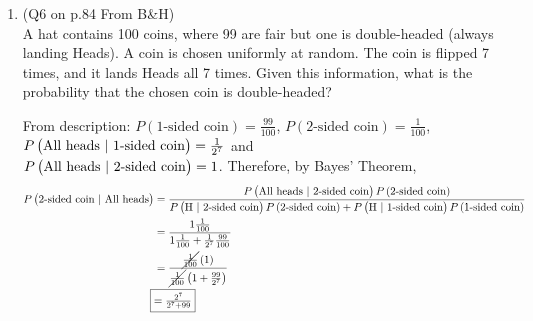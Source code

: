 \documentclass[11pt]{article}
\begin{document}
\begin{enumerate}
	\item (Q6 on p.84 From B\&H)\\
	A hat contains 100 coins, where 99 are fair but one is double-headed (always landing Heads). A coin is chosen uniformly at random. The coin is flipped 7 times, and it lands Heads all 7 times. Given this information, what is the probability that the chosen coin is double-headed?
		\begin{mdframed}
			From description: $ P\left( \text{1-sided coin} \right) = \frac{99}{100}$, $ P\left( \text{2-sided coin} \right) = \frac{1}{100} $, $ P\left( \text{All heads $ | $ 1-sided coin} \right) = \frac{1}{2^7}$ and \\
			$ P\left( \text{All heads $ | $ 2-sided coin} \right) = 1$. Therefore, by Bayes' Theorem,
			\begin{align*}
				P\left( \text{2-sided coin $ | $ All heads} \right) &= \frac{P\left( \text{All heads $ | $ 2-sided coin} \right) P\left( \text{2-sided coin} \right)}{P\left( \text{H $ | $ 2-sided coin} \right) P\left( \text{2-sided coin} \right) + P\left( \text{H $ | $ 1-sided coin} \right)P\left( \text{1-sided coin} \right)}\\
				&= \frac{1 \frac{1}{100}}{1 \frac{1}{100} + \frac{1}{2^7}\frac{99}{100}}\\
				&= \frac{\cancel{\frac{1}{100}}\left( 1 \right)}{\cancel{\frac{1}{100}}\left( 1 + \frac{99}{2^7} \right)}\\
				\Aboxed{&= \tfrac{2^7}{2^7 + 99}}
			\end{align*}
		\end{mdframed}
\end{enumerate}
\end{document}
